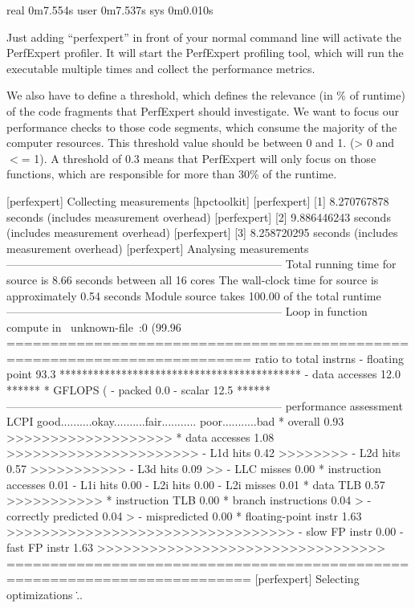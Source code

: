 \begin{prompt}
real 0m7.554s
user 0m7.537s
sys 0m0.010s
\end{prompt}

Just adding ``perfexpert'' in front of your normal command line will activate the PerfExpert profiler.  It will start the PerfExpert profiling tool, which will run the executable multiple times and collect the performance metrics.

We also have to define a threshold, which defines the relevance (in \% of runtime) of the code fragments that PerfExpert should investigate. We want to focus our performance checks to those code segments, which consume the majority of the computer resources.  This threshold value should be between 0 and 1. (> 0 and $<$= 1).  A threshold of 0.3 means that PerfExpert will only focus on those functions, which are responsible for more than 30\% of the runtime.

\begin{prompt}
[perfexpert] Collecting measurements [hpctoolkit]
[perfexpert]    [1] 8.270767878 seconds (includes measurement overhead)
[perfexpert]    [2] 9.886446243 seconds (includes measurement overhead)
[perfexpert]    [3] 8.258720295 seconds (includes measurement overhead)
[perfexpert] Analysing measurements
--------------------------------------------------------------------------
Total running time for source is 8.66 seconds between all 16 cores
The wall-clock time for source is approximately 0.54 seconds
Module source takes 100.00 of the total runtime
--------------------------------------------------------------------------
Loop in function compute in ~unknown-file~:0 (99.96%
==========================================================================
ratio to total instrns     %
- floating point       93.3 *******************************************
- data accesses        12.0 ******
* GFLOPS (%
- packed                0.0
- scalar               12.5 ******
--------------------------------------------------------------------------
performance assessment LCPI good..........okay..........fair........... poor...........bad
* overall              0.93 >>>>>>>>>>>>>>>>>>>
* data accesses        1.08 >>>>>>>>>>>>>>>>>>>>>>
- L1d hits             0.42 >>>>>>>>
- L2d hits             0.57 >>>>>>>>>>>
- L3d hits             0.09 >>
- LLC misses           0.00
* instruction accesses 0.01
- L1i hits             0.00
- L2i hits             0.00
- L2i misses           0.01
* data TLB             0.57 >>>>>>>>>>>
* instruction TLB      0.00
* branch instructions  0.04 >
- correctly predicted  0.04 >
- mispredicted         0.00
* floating-point instr 1.63 >>>>>>>>>>>>>>>>>>>>>>>>>>>>>>>>>
- slow FP instr        0.00
- fast FP instr        1.63 >>>>>>>>>>>>>>>>>>>>>>>>>>>>>>>>>
==========================================================================
[perfexpert] Selecting optimizations
\...
\end{prompt}

